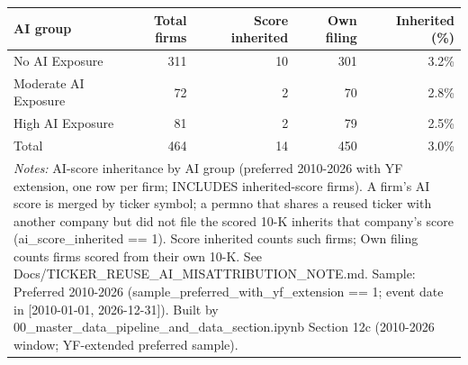 \begin{tabular}{lrrrr}
\toprule
AI group & Total firms & Score inherited & Own filing & Inherited (\%) \\
\midrule
No AI Exposure & 311 & 10 & 301 & 3.2\% \\
Moderate AI Exposure & 72 & 2 & 70 & 2.8\% \\
High AI Exposure & 81 & 2 & 79 & 2.5\% \\
Total & 464 & 14 & 450 & 3.0\% \\
\bottomrule
\multicolumn{5}{p{0.95\linewidth}}{\footnotesize \textit{Notes:} AI-score inheritance by AI group (preferred 2010-2026 with YF extension, one row per firm; INCLUDES inherited-score firms). A firm's AI score is merged by ticker symbol; a permno that shares a reused ticker with another company but did not file the scored 10-K inherits that company's score (ai\_score\_inherited == 1). Score inherited counts such firms; Own filing counts firms scored from their own 10-K. See Docs/TICKER\_REUSE\_AI\_MISATTRIBUTION\_NOTE.md. Sample: Preferred 2010-2026 (sample\_preferred\_with\_yf\_extension == 1; event date in [2010-01-01, 2026-12-31]). Built by 00\_master\_data\_pipeline\_and\_data\_section.ipynb Section 12c (2010-2026 window; YF-extended preferred sample).} \\
\end{tabular}
